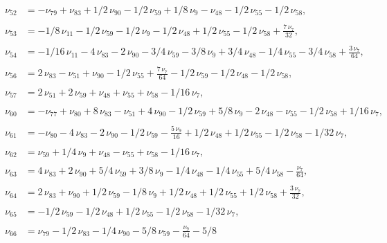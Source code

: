 \documentclass[a4paper,12pt, DIV=14, BCOR=5mm, twoside, headsepline]{scrbook}
\begin{document}
\begin{align}\label{AreaSol6}
\begin{aligned}
\nu_{{52}}&=-\nu_{{79}}+\nu_{{83}}+1/2\,\nu_{{90}}-1/2\,\nu_{{59
}}+1/8\,\nu_{{9}}-\nu_{{48}}-1/2\,\nu_{{55}}-1/2\,\nu_{{58}}, \\
\\
\nu_{{53}
}&=-1/8\,\nu_{{11}}-1/2\,\nu_{{59}}-1/2\,\nu_{{9}}-1/2\,\nu_{{48}}+1/2
\,\nu_{{55}}-1/2\,\nu_{{58}}+{\frac {7\,\nu_{{7}}}{32}}, \\
\\
\nu_{{54}}&=-1/
16\,\nu_{{11}}-4\,\nu_{{83}}-2\,\nu_{{90}}-3/4\,\nu_{{59}}-3/8\,\nu_{{
9}}+3/4\,\nu_{{48}}-1/4\,\nu_{{55}}-3/4\,\nu_{{58}}+{\frac {3\,\nu_{{7
}}}{64}}, \\
\\
\nu_{{56}}&=2\,\nu_{{83}}-\nu_{{51}}+\nu_{{90}}-1/2\,\nu_{{55}
}+{\frac {7\,\nu_{{7}}}{64}}-1/2\,\nu_{{59}}-1/2\,\nu_{{48}}-1/2\,\nu_
{{58}}, \\
\\
\nu_{{57}}&=2\,\nu_{{51}}+2\,\nu_{{59}}+\nu_{{48}}+\nu_{{55}}+
\nu_{{58}}-1/16\,\nu_{{7}}, \\
\\
\nu_{{60}}&=-\nu_{{77}}+\nu_{{80}}+8\,\nu_{{
83}}-\nu_{{51}}+4\,\nu_{{90}}-1/2\,\nu_{{59}}+5/8\,\nu_{{9}}-2\,\nu_{{
48}}-\nu_{{55}}-1/2\,\nu_{{58}}+1/16\,\nu_{{7}}, \\
\\
\nu_{{61}}&=-\nu_{{80}}
-4\,\nu_{{83}}-2\,\nu_{{90}}-1/2\,\nu_{{59}}-{\frac {5\,\nu_{{9}}}{16}
}+1/2\,\nu_{{48}}+1/2\,\nu_{{55}}-1/2\,\nu_{{58}}-1/32\,\nu_{{7}}, \\
\\
\nu_
{{62}}&=\nu_{{59}}+1/4\,\nu_{{9}}+\nu_{{48}}-\nu_{{55}}+\nu_{{58}}-1/16
\,\nu_{{7}}, \\
\\
\nu_{{63}}&=4\,\nu_{{83}}+2\,\nu_{{90}}+5/4\,\nu_{{59}}+3/8
\,\nu_{{9}}-1/4\,\nu_{{48}}-1/4\,\nu_{{55}}+5/4\,\nu_{{58}}-{\frac {
\nu_{{7}}}{64}}, \\
\\
\nu_{{64}}&=2\,\nu_{{83}}+\nu_{{90}}+1/2\,\nu_{{59}}-1/
8\,\nu_{{9}}+1/2\,\nu_{{48}}+1/2\,\nu_{{55}}+1/2\,\nu_{{58}}+{\frac {3
\,\nu_{{7}}}{32}}, \\
\\
\nu_{{65}}&=-1/2\,\nu_{{59}}-1/2\,\nu_{{48}}+1/2\,\nu
_{{55}}-1/2\,\nu_{{58}}-1/32\,\nu_{{7}}, \\
\\
\nu_{{66}}&=\nu_{{79}}-1/2\,\nu
_{{83}}-1/4\,\nu_{{90}}-5/8\,\nu_{{59}}-{\frac {\nu_{{9}}}{64}}-5/8\,

\end{aligned}
\end{align}
\end{document}

